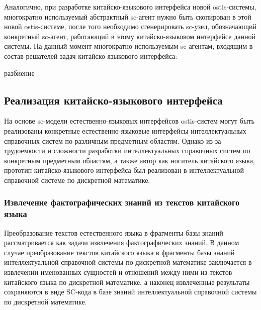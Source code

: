 Аналогично, при разработке китайско-языкового интерфейса новой ostis-системы, многократно используемый абстрактный sc-агент нужно быть скопирован в этой новой ostis-системе, после того необходимо сгенерировать sc-узел, обозначающий конкретный sc-агент, работающий в этому китайско-языковом интерфейсе данной системы. На данный момент многократно используемым sc-агентам, входящим в состав решателей задач китайско-языкового интерфейса:
\begin{SCn}
	\begin{scnrelfromset}{разбиение}
	\end{scnrelfromset}
\end{SCn}

\subsection {Реализация китайско-языкового интерфейса}
На основе sc-модели естественно-языковых интерфейсов ostis-систем могут быть реализованы конкретные естественно-языковые интерфейсы интеллектуальных справочных систем по различным предметным областям. Однако из-за трудоемкости и сложности разработки интеллектуальных справочных систем по конкретным предметным областям, а также автор как носитель китайского языка, прототип китайско-языкового интерфейса был реализован в интеллектуальной справочной системе по дискретной математике.

\subsubsection{Извлечение фактографических знаний из текстов китайского языка}
Преобразование текстов естественного языка в фрагменты базы знаний рассматривается как задачи извлечения фактографических знаний. В данном случае преобразование текстов китайского языка в фрагменты базы знаний интеллектуальной справочной системы по дискретной математике заключается в извлечении именованных сущностей и отношений между ними из текстов китайского языка по дискретной математике, а наконец извлеченные результаты сохраняются в виде SC-кода в базе знаний интеллектуальной справочной системы по дискретной математике.

